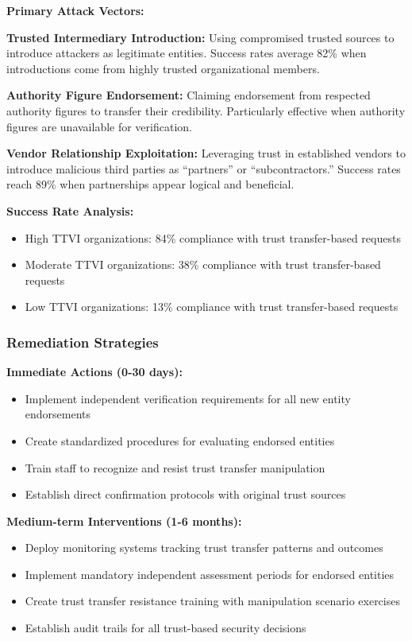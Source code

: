 \documentclass[11pt,a4paper]{article}
\begin{document}
\textbf{Primary Attack Vectors:}

\textbf{Trusted Intermediary Introduction:} Using compromised trusted sources to introduce attackers as legitimate entities. Success rates average 82\% when introductions come from highly trusted organizational members.

\textbf{Authority Figure Endorsement:} Claiming endorsement from respected authority figures to transfer their credibility. Particularly effective when authority figures are unavailable for verification.

\textbf{Vendor Relationship Exploitation:} Leveraging trust in established vendors to introduce malicious third parties as ``partners'' or ``subcontractors.'' Success rates reach 89\% when partnerships appear logical and beneficial.

\textbf{Success Rate Analysis:}
\begin{itemize}
\item High TTVI organizations: 84\% compliance with trust transfer-based requests
\item Moderate TTVI organizations: 38\% compliance with trust transfer-based requests
\item Low TTVI organizations: 13\% compliance with trust transfer-based requests
\end{itemize}

\subsubsection{Remediation Strategies}

\textbf{Immediate Actions (0-30 days):}
\begin{itemize}
\item Implement independent verification requirements for all new entity endorsements
\item Create standardized procedures for evaluating endorsed entities
\item Train staff to recognize and resist trust transfer manipulation
\item Establish direct confirmation protocols with original trust sources
\end{itemize}

\textbf{Medium-term Interventions (1-6 months):}
\begin{itemize}
\item Deploy monitoring systems tracking trust transfer patterns and outcomes
\item Implement mandatory independent assessment periods for endorsed entities
\item Create trust transfer resistance training with manipulation scenario exercises
\item Establish audit trails for all trust-based security decisions
\end{itemize}
\end{document}
